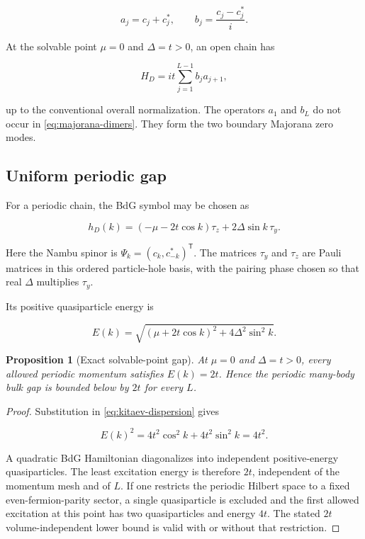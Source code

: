 \documentclass[12pt]{article}
\newtheorem{proposition}[theorem]{Proposition}
\theoremstyle{definition}
\theoremstyle{remark}
\begin{document}
\begin{equation}
  a_j=c_j+c_j^*,
  \qquad
  b_j=\frac{c_j-c_j^*}{i}.
\end{equation}

At the solvable point $\mu=0$ and $\Delta=t>0$, an open chain has

\begin{equation}
  H_D=it\sum_{j=1}^{L-1}b_j a_{j+1},
  \label{eq:majorana-dimers}
\end{equation}

up to the conventional overall normalization.  The operators $a_1$ and
$b_L$ do not occur in \cref{eq:majorana-dimers}.  They form the two boundary
Majorana zero modes.

\subsection{Uniform periodic gap}

For a periodic chain, the BdG symbol may be chosen as

\begin{equation}
  h_D(k)=(-\mu-2t\cos k)\tau_z+2\Delta\sin k\,\tau_y.
  \label{eq:class-d-symbol}
\end{equation}

Here the Nambu spinor is
$\Psi_k=(c_k,c_{-k}^*)^{\mathsf T}$.  The matrices $\tau_y$ and $\tau_z$ are
Pauli matrices in this ordered particle-hole basis, with the pairing phase
chosen so that real $\Delta$ multiplies $\tau_y$.

Its positive quasiparticle energy is

\begin{equation}
  E(k)=\sqrt{(\mu+2t\cos k)^2+4\Delta^2\sin^2 k}.
  \label{eq:kitaev-dispersion}
\end{equation}

\begin{proposition}[Exact solvable-point gap]
\label{prop:kitaev-gap}
At $\mu=0$ and $\Delta=t>0$, every allowed periodic momentum satisfies
$E(k)=2t$.  Hence the periodic many-body bulk gap is bounded below by $2t$
for every $L$.
\end{proposition}

\begin{proof}
Substitution in \cref{eq:kitaev-dispersion} gives

\begin{equation}
  E(k)^2=4t^2\cos^2k+4t^2\sin^2k=4t^2.
\end{equation}

A quadratic BdG Hamiltonian diagonalizes into independent positive-energy
quasiparticles.  The least excitation energy is therefore $2t$, independent
of the momentum mesh and of $L$.
If one restricts the periodic Hilbert space to a fixed even-fermion-parity
sector, a single quasiparticle is excluded and the first allowed excitation
at this point has two quasiparticles and energy $4t$.  The stated $2t$
volume-independent lower bound is valid with or without that restriction.
\end{proof}
\end{document}
